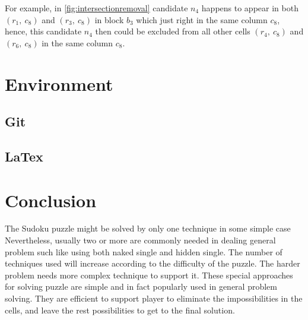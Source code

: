 \documentclass[11pt]{report}
\begin{document}
For example, in \ref{fig:intersectionremoval} candidate $n_{4}$ happens to appear in both $(r_{1},\ c_{8})$ and $(r_{3},\ c_{8})$ in block $b_{3}$ which just right in the same column $c_{8}$, hence, this candidate $n_{4}$ then could be excluded from all other cells $(r_{4},\ c_{8})$ and $(r_{6},\ c_{8})$ in the same column $c_{8}$.



\chapter{Environment}
\label{sec:Environment}

\section{Git}
\label{sec:git}


\section{LaTex}
\label{sec:miktex}


\chapter{Conclusion}
\label{sec:Conclusion}
The Sudoku puzzle might be solved by only one technique in some simple case Nevertheless, usually two or more are commonly needed in dealing general problem such like using both naked single and hidden single. The number of techniques used will increase according to the difficulty of the puzzle. The harder problem needs more complex technique to support it.
These special approaches for solving puzzle are simple and in fact popularly used in general problem solving. They are efficient to support player to eliminate the impossibilities in the cells, and leave the rest possibilities to get to the final solution.





\end{document}
